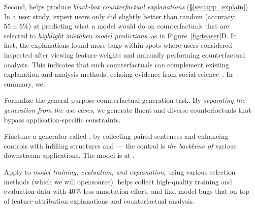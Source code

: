 Second, \sysname helps produce \emph{black-box counterfactual explanations} (\S\ref{sec:app_explain})
In a user study, expert users only did slightly better than random (accuracy: $55 \pm 6\%$) at predicting what a model would do on \sysname counterfactuals that are selected to \emph{highlight mistaken model predictions}, as in Figure~\ref{fig:teaser}D.
In fact, the explanations found more bugs within spots where users considered inspected after viewing feature weights and manually performing counterfactual analysis.
This indicates that such counterfactuals can complement existing explanation and analysis methods, echoing evidence from social science~\cite{miller}. In summary, we:

\begin{compactenum}
\item  Formalize the general-purpose counterfactual generation task. 
By \emph{separating the generation from the use cases}, we generate fluent and diverse counterfactuals that bypass application-specific constraints.
\item Finetune a generator called \sysname, by collecting paired sentences and enhancing controls with infilling structures and \tagstrs --- the control is \emph{the backbone of} various downstream applications.
The model is at \modelurl.
\item Apply \sysname to \emph{model training, evaluation, and explanation}, using various selection methods (which we will opensource).
\sysname helps collect high-quality training and evaluation data with 40\% less annotation effort, and find model bugs that on top of feature attribution explanations and counterfactual analysis.
\end{compactenum}


